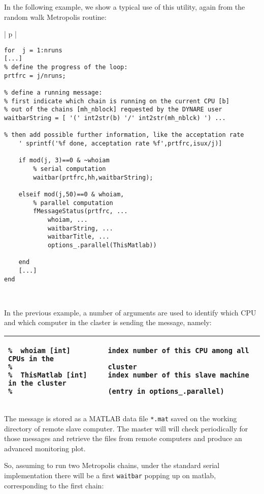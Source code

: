 \documentclass[12pt,a4paper,pdftex]{article}
\begin{document}
In the following example, we show a typical use of this utility, again from the random walk Metropolis routine:
\singlespacing
{\footnotesize
\noindent\begin{tabular}[b]{| p{\linewidth} |}
\hline
\begin{verbatim}
for  j = 1:nruns
[...]
% define the progress of the loop:
prtfrc = j/nruns;

% define a running message:
% first indicate which chain is running on the current CPU [b]
% out of the chains [mh_nblock] requested by the DYNARE user
waitbarString = [ '(' int2str(b) '/' int2str(mh_nblck) ') ...

% then add possible further information, like the acceptation rate
    ' sprintf('%f done, acceptation rate %f',prtfrc,isux/j)]

    if mod(j, 3)==0 & ~whoiam
        % serial computation
        waitbar(prtfrc,hh,waitbarString);

    elseif mod(j,50)==0 & whoiam,
        % parallel computation
        fMessageStatus(prtfrc, ...
            whoiam, ...
            waitbarString, ...
            waitbarTitle, ...
            options_.parallel(ThisMatlab))

    end
    [...]
end
\end{verbatim}
\\ \hline
\end{tabular}
}
\doublespacing
In the previous example, a number of arguments are used to identify which CPU and which computer in the claster is sending the message, namely:
\singlespacing
{\footnotesize
\noindent\begin{tabular}[b]{| p{\linewidth} |}
\hline
\begin{verbatim}
%  whoiam [int]         index number of this CPU among all CPUs in the
%                       cluster
%  ThisMatlab [int]     index number of this slave machine in the cluster
%                       (entry in options_.parallel)
\end{verbatim}
\\ \hline
\end{tabular}
}
\doublespacing
The message is stored as a MATLAB data file \verb"*.mat" saved on the working directory of remote slave computer. The master will will check periodically for those messages and retrieve the files from remote computers and produce an advanced monitoring plot.

So, assuming to run two Metropolis chains, under the standard serial implementation there will be a first \verb"waitbar" popping up on matlab, corresponding to the first chain:
\end{document}
